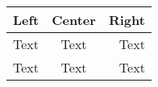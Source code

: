 \documentclass{article}
\begin{document}
\begin{tabular}{|l|c|r|}
\hline
Left & Center & Right \\
\hline
Text & \cellcolor{yellow}Text & Text \\
\hline
Text & Text & Text \\
\hline
\end{tabular}
\end{document}
